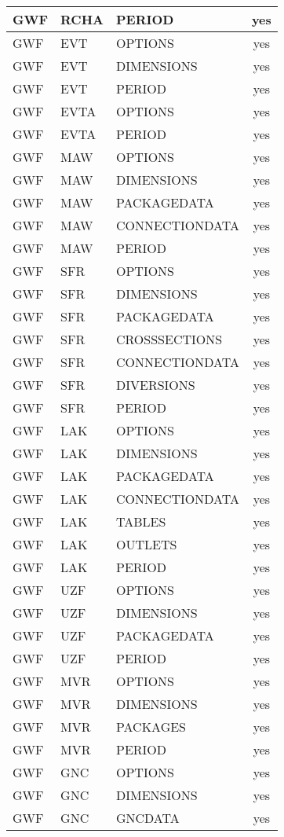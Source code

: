 \begin{longtable}{p{1.5cm} p{1.5cm} p{3cm} c}
GWF & RCHA & PERIOD & yes \\ 
\hline
GWF & EVT & OPTIONS & yes \\ 
GWF & EVT & DIMENSIONS & yes \\ 
GWF & EVT & PERIOD & yes \\ 
\hline
GWF & EVTA & OPTIONS & yes \\ 
GWF & EVTA & PERIOD & yes \\ 
\hline
GWF & MAW & OPTIONS & yes \\ 
GWF & MAW & DIMENSIONS & yes \\ 
GWF & MAW & PACKAGEDATA & yes \\ 
GWF & MAW & CONNECTIONDATA & yes \\ 
GWF & MAW & PERIOD & yes \\ 
\hline
GWF & SFR & OPTIONS & yes \\ 
GWF & SFR & DIMENSIONS & yes \\ 
GWF & SFR & PACKAGEDATA & yes \\ 
GWF & SFR & CROSSSECTIONS & yes \\ 
GWF & SFR & CONNECTIONDATA & yes \\ 
GWF & SFR & DIVERSIONS & yes \\ 
GWF & SFR & PERIOD & yes \\ 
\hline
GWF & LAK & OPTIONS & yes \\ 
GWF & LAK & DIMENSIONS & yes \\ 
GWF & LAK & PACKAGEDATA & yes \\ 
GWF & LAK & CONNECTIONDATA & yes \\ 
GWF & LAK & TABLES & yes \\ 
GWF & LAK & OUTLETS & yes \\ 
GWF & LAK & PERIOD & yes \\ 
\hline
GWF & UZF & OPTIONS & yes \\ 
GWF & UZF & DIMENSIONS & yes \\ 
GWF & UZF & PACKAGEDATA & yes \\ 
GWF & UZF & PERIOD & yes \\ 
\hline
GWF & MVR & OPTIONS & yes \\ 
GWF & MVR & DIMENSIONS & yes \\ 
GWF & MVR & PACKAGES & yes \\ 
GWF & MVR & PERIOD & yes \\ 
\hline
GWF & GNC & OPTIONS & yes \\ 
GWF & GNC & DIMENSIONS & yes \\ 
GWF & GNC & GNCDATA & yes \\ 

\end{longtable}
